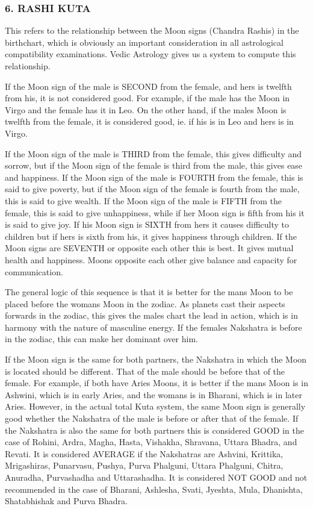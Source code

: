 \subsubsection{6. RASHI KUTA}
 

This refers to the relationship between the Moon signs (Chandra Rashis) in the birthchart, which is obviously an important consideration in all astrological compatibility examinations. Vedic Astrology gives us a system to compute this relationship.

 

If the Moon sign of the male is SECOND from the female, and hers is twelfth from his, it is not considered good. For example, if the male has the Moon in Virgo and the female has it in Leo. On the other hand, if the males Moon is twelfth from the female, it is considered good, ie. if his is in Leo and hers is in Virgo.

 

If the Moon sign of the male is THIRD from the female, this gives difficulty and sorrow, but if the Moon sign of the female is third from the male, this gives ease and happiness.
If the Moon sign of the male is FOURTH from the female, this is said to give poverty, but if the Moon sign of the female is fourth from the male, this is said to give wealth.
If the Moon sign of the male is FIFTH from the female, this is said to give unhappiness, while if her Moon sign is fifth from his it is said to give joy.
If his Moon sign is SIXTH from hers it causes difficulty to children but if hers is sixth from his, it gives happiness through children.
If the Moon signs are SEVENTH or opposite each other this is best. It gives mutual health and happiness. Moons opposite each other give balance and capacity for communication.
 

The general logic of this sequence is that it is better for the mans Moon to be placed before the womans Moon in the zodiac. As planets cast their aspects forwards in the zodiac, this gives the males chart the lead in action, which is in harmony with the nature of masculine energy. If the females Nakshatra is before in the zodiac, this can make her dominant over him.

 

If the Moon sign is the same for both partners, the Nakshatra in which the Moon is located should be different. That of the male should be before that of the female. For example, if both have Aries Moons, it is better if the mans Moon is in Ashwini, which is in early Aries, and the womans is in Bharani, which is in later Aries. However, in the actual total Kuta system, the same Moon sign is generally good whether the Nakshatra of the male is before or after that of the female.
If the Nakshatra is also the same for both partners this is considered GOOD in the case of Rohini, Ardra, Magha, Hasta, Vishakha, Shravana, Uttara Bhadra, and Revati.
It is considered AVERAGE if the Nakshatras are Ashvini, Krittika, Mrigashiras, Punarvasu, Pushya, Purva Phalguni, Uttara Phalguni, Chitra, Anuradha, Purvashadha and Uttarashadha.
It is considered NOT GOOD and not recommended in the case of Bharani, Ashlesha, Svati, Jyeshta, Mula, Dhanishta, Shatabhishak and Purva Bhadra.
 

